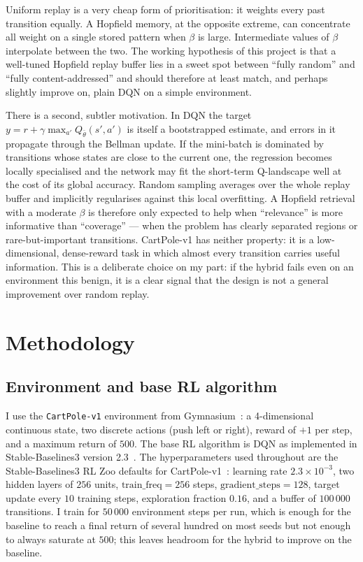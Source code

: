 \documentclass[a4paper,11pt]{article}
\begin{document}
Uniform replay is a very cheap form of prioritisation: it weights every
past transition equally. A Hopfield memory, at the opposite extreme, can
concentrate all weight on a single stored pattern when $\beta$ is large.
Intermediate values of $\beta$ interpolate between the two. The working
hypothesis of this project is that a well-tuned Hopfield replay buffer
lies in a sweet spot between ``fully random'' and ``fully content-addressed''
and should therefore at least match, and perhaps slightly improve on,
plain DQN on a simple environment.

There is a second, subtler motivation. In DQN the target
$y = r + \gamma \max_{a'} Q_{\bar\theta}(s',a')$ is itself a bootstrapped
estimate, and errors in it propagate through the Bellman update. If the
mini-batch is dominated by transitions whose states are close to the
current one, the regression becomes locally specialised and the network
may fit the short-term Q-landscape well at the cost of its global
accuracy. Random sampling averages over the whole replay buffer and
implicitly regularises against this local overfitting. A Hopfield
retrieval with a moderate $\beta$ is therefore only expected to help
when ``relevance'' is more informative than ``coverage'' --- when the
problem has clearly separated regions or rare-but-important transitions.
CartPole-v1 has neither property: it is a low-dimensional, dense-reward
task in which almost every transition carries useful information. This
is a deliberate choice on my part: if the hybrid fails even on an
environment this benign, it is a clear signal that the design is not a
general improvement over random replay.

\section{Methodology}
\label{sec:methodology}

\subsection{Environment and base RL algorithm}

I use the \texttt{CartPole-v1} environment from
Gymnasium~\citep{brockman2016openai}: a 4-dimensional continuous state,
two discrete actions (push left or right), reward of $+1$ per step, and a
maximum return of $500$. The base RL algorithm is DQN as implemented in
Stable-Baselines3 version 2.3~\citep{raffin2021stable}. The hyperparameters
used throughout are the Stable-Baselines3 RL Zoo defaults for
CartPole-v1~\citep{rlzoo2020}: learning rate $2.3\!\times\!10^{-3}$,
two hidden layers of $256$ units, $\mathrm{train\_freq}=256$ steps,
$\mathrm{gradient\_steps}=128$, target update every $10$ training steps,
exploration fraction $0.16$, and a buffer of $100\,000$ transitions. I
train for $50\,000$ environment steps per run, which is enough for the
baseline to reach a final return of several hundred on most seeds but not
enough to always saturate at $500$; this leaves headroom for the hybrid
to improve on the baseline.
\end{document}
